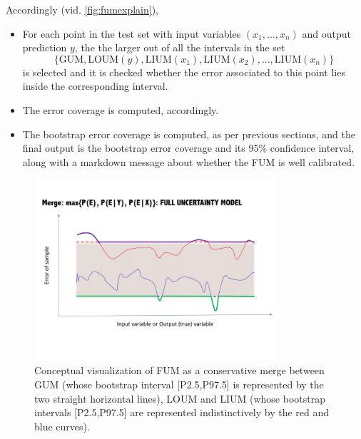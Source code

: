 Accordingly (vid. \autoref{fig:fumexplain}), 

\begin{itemize}
	\item For each point in the test set with input variables $(x_1,...,x_n)$ and output prediction $y$, the the larger out of all the intervals in the set
	$$
	\{\text{GUM}, \text{LOUM}(y), \text{LIUM}(x_1), \text{LIUM}(x_2), ..., \text{LIUM}(x_n)\}
	$$
	is selected and it is checked whether the error associated to this point lies inside the corresponding interval.
	\item The error coverage is computed, accordingly.
	\item The bootstrap error coverage is computed, as per previous sections, and the final output is the bootstrap error coverage and its 95\% confidence interval, along with a markdown message about whether the FUM is well calibrated.\\
\end{itemize}

\begin{figure}
	\centering
	\includegraphics[width=0.8\textwidth]{Figures/uncertainty/FUMexplanation.png}
	\caption{Conceptual visualization of FUM as a conservative merge between GUM (whose bootstrap interval [P2.5,P97.5] is represented by the two straight horizontal lines), LOUM and LIUM (whose bootstrap intervals [P2.5,P97.5] are represented indistinctively by the red and blue curves).}
	\label{fig:fumexplain}
\end{figure}
